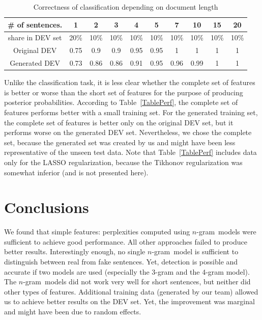 \documentclass[11pt]{article}
\newcommand{\ngram}{\mbox{$n$-gram }}
\begin{document}
\begin{table}\centering
\caption{Correctness of classification depending on document length\label{TableCorr}}
\begin{tabular}{c|c|c|c|c|c|c|c|c|c}
\# of sentences.  &  1   &  2   &   3   &  4   &   5   &    7  & 10   & 15   &  20  \\\hline
share in DEV set  & 20\% & 10\% &  10\% & 10\% &  10\% &  10\% & 10\% & 10\% & 10\%  \\\hline\hline
Original DEV      & 0.75 & 0.9  &  0.9  & 0.95 & 0.95  &    1  &   1  &   1  &  1 \\\hline
Generated DEV     & 0.73 & 0.86 &  0.86 & 0.91 & 0.95  &   0.96&  0.99 &  1  &  1 \\\hline
\end{tabular}
\end{table}

Unlike the classification task, it is less clear whether the complete set of features is better or worse
than the short set of features for the purpose of producing posterior probabilities.
According to Table~\ref{TablePerf}, the complete set of features performs better with a small training set.
For the generated training set, the complete set of features is better only on the original DEV set,
but it performs worse on the generated DEV set.
Nevertheless, we chose the complete set,
because the generated set was created by us and might have been less representative of the unseen test data.
Note that Table~\ref{TablePerf} includes data only for the LASSO
regularization, because the Tikhonov regularization was somewhat inferior (and is not presented here).

\section{Conclusions}
We found that simple features: perplexities computed using \ngram models were sufficient to achieve good performance.
All other approaches failed to produce better results.
Interestingly enough, no single \ngram model is sufficient to distinguish between real from fake sentences.
Yet, detection is possible and accurate if two models are used (especially the 3-gram and the 4-gram model). 
The \ngram models did not work very well for short sentences, but neither did other types of features.
Additional training data (generated by our team) allowed us to achieve better
results on the DEV set. Yet, the improvement was marginal and might have been due to random effects.




\end{document}
